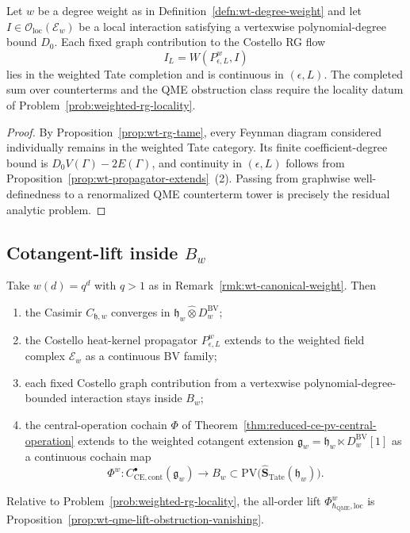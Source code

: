 \begin{thm}\label{thm:wt-rg-compatibility}
  Let $w$ be a degree weight as in
  Definition~\ref{defn:wt-degree-weight} and let
  $I\in\mathcal O_{\mathrm{loc}}(\mathcal E_w)$ be a local
  interaction satisfying a vertexwise polynomial-degree bound $D_0$.
  Each fixed graph contribution to the Costello RG flow
  $$I_L=W(P_{\epsilon,L}^{w},I)$$
  lies in the weighted Tate completion and is continuous in
  $(\epsilon,L)$.  The completed sum over counterterms and the QME
  obstruction class require the locality datum of
  Problem~\ref{prob:weighted-rg-locality}.
\end{thm}

\begin{proof}
  By Proposition~\ref{prop:wt-rg-tame}, every Feynman diagram
  considered individually remains in the weighted Tate category.  Its
  finite coefficient-degree bound is
  $D_0V(\Gamma)-2E(\Gamma)$, and continuity in $(\epsilon,L)$ follows
  from Proposition~\ref{prop:wt-propagator-extends}~(2).  Passing from
  graphwise well-definedness to a renormalized QME counterterm tower is
  precisely the residual analytic problem.
\end{proof}

\subsection*{Cotangent-lift inside \(B_w\)}

\begin{cor}\label{cor:wt-cotangent-lift}
  Take $w(d)=q^d$ with $q>1$ as in
  Remark~\ref{rmk:wt-canonical-weight}.  Then
  \begin{enumerate}[label=(\alph*)]
    \item the Casimir $C_{\mathfrak h,w}$ converges in
      $\mathfrak h_w\widehat\otimes D^{\mathrm{BV}}_w$;
    \item the Costello heat-kernel propagator $P^w_{\epsilon,L}$ extends
      to the weighted field complex $\mathcal E_w$ as a continuous BV
      family;
    \item each fixed Costello graph contribution from a vertexwise
      polynomial-degree-bounded interaction stays inside $B_w$;
    \item the central-operation cochain $\Phi$ of
      Theorem~\ref{thm:reduced-ce-pv-central-operation} extends to the
      weighted cotangent extension
      $\mathfrak g_w=\mathfrak h_w\ltimes D^{\mathrm{BV}}_w[1]$
      as a continuous cochain map
      $$\Phi^w\colon C^\bullet_{\mathrm{CE},\mathrm{cont}}(\mathfrak g_w)
        \longrightarrow B_w\subset
        \mathrm{PV}\bigl(\widehat{\mathbf S}_{\mathrm{Tate}}
        (\mathfrak h_w)\bigr).$$
  \end{enumerate}
  Relative to Problem~\ref{prob:weighted-rg-locality}, the all-order
  lift $\Phi_{\hbar_{\mathrm{QME}},\mathrm{loc}}^w$ is
  Proposition~\ref{prop:wt-qme-lift-obstruction-vanishing}.
\end{cor}


